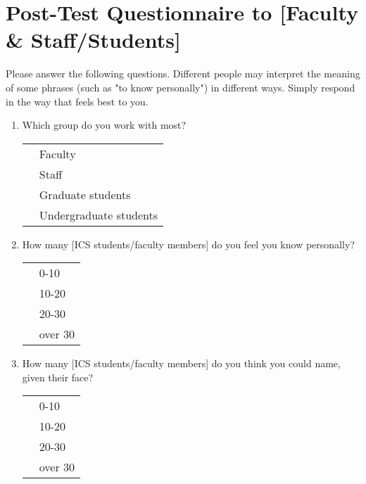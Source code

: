 \newpage
\chapter{Post-Test Questionnaire to [Faculty \& Staff/Students]}
\label{sec:post-test}
Please answer the following questions.  Different people may interpret the
meaning of some phrases (such as "to know personally") in different
ways. Simply respond in the way that feels best to you.

\begin{enumerate}

\item{Which group do you work with most?}\\
  \begin{tabular}{ll}
    \underline{  }\underline{  }\underline{  }  & Faculty \\
    \underline{  }\underline{  }\underline{  }  & Staff \\
    \underline{  }\underline{  }\underline{  }  & Graduate students \\
    \underline{  }\underline{  }\underline{  }  & Undergraduate students \\
  \end{tabular}

\item{How many [ICS students/faculty members] do you feel you know
  personally?}\\
  \begin{tabular}{ll}
    \underline{  }\underline{  }\underline{  }  & 0-10 \\
    \underline{  }\underline{  }\underline{  }  & 10-20 \\
    \underline{  }\underline{  }\underline{  }  & 20-30 \\
    \underline{  }\underline{  }\underline{  }  & over 30 \\
  \end{tabular}

\item{How many [ICS students/faculty members] do you think you could name,
  given their face?}\\
  \begin{tabular}{ll}
    \underline{  }\underline{  }\underline{  }  & 0-10 \\
    \underline{  }\underline{  }\underline{  }  & 10-20 \\
    \underline{  }\underline{  }\underline{  }  & 20-30 \\
    \underline{  }\underline{  }\underline{  }  & over 30 \\
  \end{tabular}


\end{enumerate}
